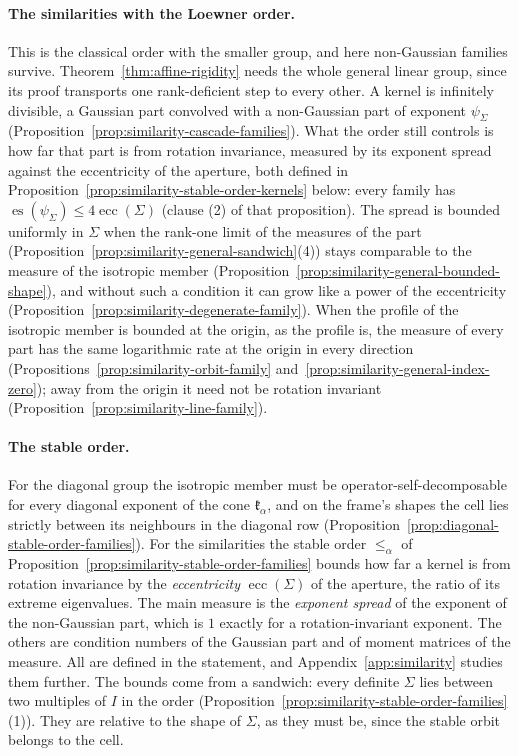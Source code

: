 \paragraph{The similarities with the Loewner order.} This is the classical order with the smaller
group, and here non-Gaussian families survive. Theorem~\ref{thm:affine-rigidity} needs the whole
general linear group, since its proof transports one rank-deficient step to every other. A kernel is
infinitely divisible, a Gaussian part convolved with a non-Gaussian part of exponent $\psi_\Sigma$
(Proposition~\ref{prop:similarity-cascade-families}). What the order still controls is how far that
part is from rotation invariance, measured by its exponent spread against the eccentricity of the
aperture, both defined in Proposition~\ref{prop:similarity-stable-order-kernels} below: every family has
$\operatorname{es}(\psi_\Sigma) \le 4\operatorname{ecc}(\Sigma)$ (clause (2) of that proposition). The spread
is bounded uniformly in $\Sigma$ when the rank-one limit of the \Levy{} measures of the part
(Proposition~\ref{prop:similarity-general-sandwich}(4)) stays comparable to the \Levy{} measure of the
isotropic member (Proposition~\ref{prop:similarity-general-bounded-shape}),
and without such a condition it can grow like a power of the eccentricity
(Proposition~\ref{prop:similarity-degenerate-family}). When the profile of the isotropic member is
bounded at the origin, as the \Matern{} profile is, the \Levy{} measure of every part has the same
logarithmic rate at the origin in every direction (Propositions~\ref{prop:similarity-orbit-family}
and~\ref{prop:similarity-general-index-zero}); away from the origin it need not be rotation invariant
(Proposition~\ref{prop:similarity-line-family}).

\paragraph{The stable order.} For the diagonal group the isotropic member must be
operator-self-decomposable for every diagonal exponent of the cone $\mathfrak k_\alpha$, and on the
frame's shapes the cell lies strictly between its neighbours in the diagonal row
(Proposition~\ref{prop:diagonal-stable-order-families}). For the similarities the stable order
$\le_\alpha$ of Proposition~\ref{prop:similarity-stable-order-families} bounds how far a kernel is from
rotation invariance by the \emph{eccentricity} $\operatorname{ecc}(\Sigma)$ of the aperture, the ratio of
its extreme eigenvalues. The main measure is the \emph{exponent spread} of the exponent of the
non-Gaussian part, which is $1$ exactly for a rotation-invariant exponent. The others are condition
numbers of the Gaussian part and of moment matrices of the \Levy{} measure. All are defined in the
statement, and Appendix~\ref{app:similarity} studies them further. The bounds come from a sandwich:
every definite $\Sigma$ lies between two multiples of $I$ in the order
(Proposition~\ref{prop:similarity-stable-order-families}(1)). They are relative to the shape of
$\Sigma$, as they must be, since the stable orbit belongs to the cell.

